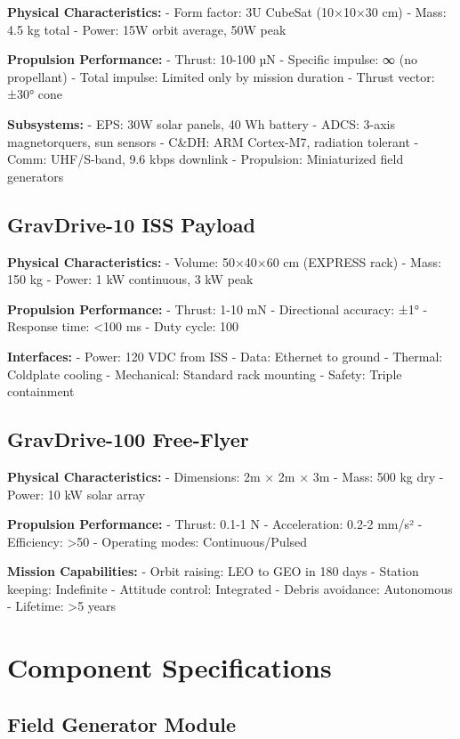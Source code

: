 \documentclass[12pt,letterpaper]{book}
\theoremstyle{definition}
\theoremstyle{plain}
\theoremstyle{remark}
\begin{document}
{{{{{\textbf{Physical Characteristics:}
- Form factor: 3U CubeSat (10×10×30 cm)
- Mass: 4.5 kg total
- Power: 15W orbit average, 50W peak

\textbf{Propulsion Performance:}
- Thrust: 10-100 µN
- Specific impulse: ∞ (no propellant)
- Total impulse: Limited only by mission duration
- Thrust vector: ±30° cone

\textbf{Subsystems:}
- EPS: 30W solar panels, 40 Wh battery
- ADCS: 3-axis magnetorquers, sun sensors
- C&DH: ARM Cortex-M7, radiation tolerant
- Comm: UHF/S-band, 9.6 kbps downlink
- Propulsion: Miniaturized field generators

\subsection{GravDrive-10 ISS Payload}

\textbf{Physical Characteristics:}
- Volume: 50×40×60 cm (EXPRESS rack)
- Mass: 150 kg
- Power: 1 kW continuous, 3 kW peak

\textbf{Propulsion Performance:}
- Thrust: 1-10 mN
- Directional accuracy: ±1°
- Response time: <100 ms
- Duty cycle: 100%

\textbf{Interfaces:}
- Power: 120 VDC from ISS
- Data: Ethernet to ground
- Thermal: Coldplate cooling
- Mechanical: Standard rack mounting
- Safety: Triple containment

\subsection{GravDrive-100 Free-Flyer}

\textbf{Physical Characteristics:}
- Dimensions: 2m × 2m × 3m
- Mass: 500 kg dry
- Power: 10 kW solar array

\textbf{Propulsion Performance:}
- Thrust: 0.1-1 N
- Acceleration: 0.2-2 mm/s²
- Efficiency: >50%
- Operating modes: Continuous/Pulsed

\textbf{Mission Capabilities:}
- Orbit raising: LEO to GEO in 180 days
- Station keeping: Indefinite
- Attitude control: Integrated
- Debris avoidance: Autonomous
- Lifetime: >5 years

\section{Component Specifications}

\subsection{Field Generator Module}

}}}}}
\end{document}
